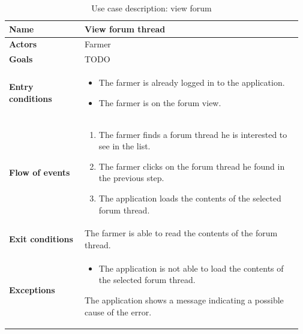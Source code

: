 \begin{table}[H]
    \centering
	\begin{tabular}{@{}p{0.25\linewidth} p{0.72\linewidth}@{}}
        \toprule
		\textbf{Name}               & View forum thread\\
		\midrule
		\textbf{Actors}             & Farmer\\
		\midrule
		\textbf{Goals}              & TODO \\
		\midrule
		
		\textbf{Entry conditions}   & \begin{itemize}[leftmargin=.4cm,noitemsep,topsep=0pt,before=\vspace{-3mm},after=\vspace{-4mm}]
		    \item The farmer is already logged in to the application.
		    \item The farmer is on the forum view.
		\end{itemize}\\
		\midrule
		
		\textbf{Flow of events}     & \begin{enumerate}[leftmargin=.4cm,noitemsep,topsep=0pt,before=\vspace{-3mm},after=\vspace{-4mm}]
		    \item The farmer finds a forum thread he is interested to see in the list.
		    \item The farmer clicks on the forum thread he found in the previous step.
		    \item The application loads the contents of the selected forum thread.
		\end{enumerate}\\
		\midrule
		\textbf{Exit conditions}    &  The farmer is able to read the contents of the forum thread. \\
		\midrule
		
		\textbf{Exceptions}         & 
	    \begin{itemize}[leftmargin=.4cm,noitemsep,topsep=0pt,before=\vspace{-3mm}]
		   \item The application is not able to load the contents of the selected forum thread.
		\end{itemize}
		The application shows a message indicating a possible cause of the error.
		\\\bottomrule
	\end{tabular}
	\caption{Use case description: view forum} 
\end{table}

